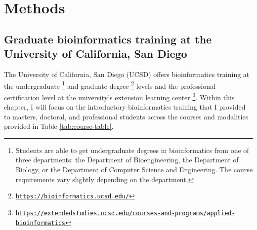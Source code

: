 \section{Methods}

\subsection{Graduate bioinformatics training at the University of California, San Diego}

The University of California, San Diego (UCSD) offers bioinformatics training at the undergraduate \footnote{Students are able to get undergraduate degrees in bioinformatics from one of three departments: the Department of Bioengineering, the Department of Biology, or the Department of Computer Science and Engineering. The course requirements vary slightly depending on the department.} and graduate degree \footnote{\href{https://bioinformatics.ucsd.edu/}{\texttt{https://bioinformatics.ucsd.edu/}}} levels and the professional certification level at the university’s extension learning center \footnote{\href{https://extendedstudies.ucsd.edu/courses-and-programs/applied-bioinformatics}{\texttt{https://extendedstudies.ucsd.edu/courses-and-programs/applied-bioinformatics}}}. Within this chapter, I will focus on the introductory bioinformatics training that I provided to masters, doctoral, and professional students across the courses and modalities provided in Table \ref{tab:course-table}. 

